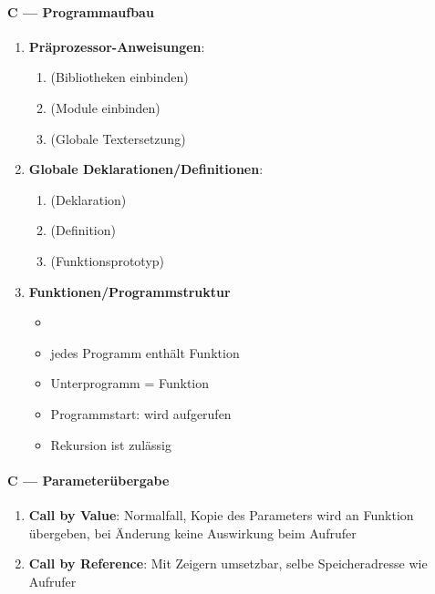 \paragraph{C --- Programmaufbau}
\begin{enumerate}
  \item \textbf{Präprozessor-Anweisungen}:
  \begin{enumerate}
    \item {} (Bibliotheken einbinden)
    \item {} (Module einbinden)
    \item {} (Globale Textersetzung)
  \end{enumerate}
  \item \textbf{Globale Deklarationen/Definitionen}:
  \begin{enumerate}
    \item {} (Deklaration)
    \item {} (Definition)
    \item {} (Funktionsprototyp)
  \end{enumerate}

  \item \textbf{Funktionen/Programmstruktur}
  \begin{itemize}
    \item {}
    \item jedes Programm enthält Funktion 
    \item Unterprogramm = Funktion
    \item Programmstart:  wird aufgerufen
    \item Rekursion ist zulässig
  \end{itemize}
\end{enumerate}

\paragraph{C --- Parameterübergabe}
\begin{enumerate}
  \item \textbf{Call by Value}: Normalfall, Kopie des Parameters wird an Funktion übergeben, bei Änderung keine Auswirkung beim Aufrufer
  \item \textbf{Call by Reference}: Mit Zeigern umsetzbar, selbe Speicheradresse wie Aufrufer
\end{enumerate}


